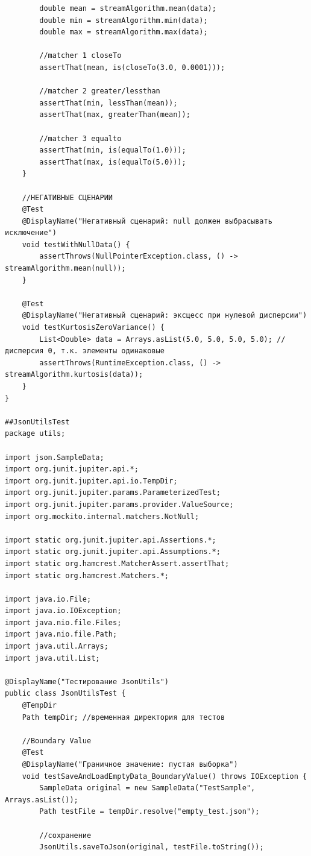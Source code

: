 \begin{verbatim}
        double mean = streamAlgorithm.mean(data);
        double min = streamAlgorithm.min(data);
        double max = streamAlgorithm.max(data);

        //matcher 1 closeTo
        assertThat(mean, is(closeTo(3.0, 0.0001)));

        //matcher 2 greater/lessthan
        assertThat(min, lessThan(mean));
        assertThat(max, greaterThan(mean));

        //matcher 3 equalto
        assertThat(min, is(equalTo(1.0)));
        assertThat(max, is(equalTo(5.0)));
    }

    //НЕГАТИВНЫЕ СЦЕНАРИИ
    @Test
    @DisplayName("Негативный сценарий: null должен выбрасывать исключение")
    void testWithNullData() {
        assertThrows(NullPointerException.class, () -> streamAlgorithm.mean(null));
    }

    @Test
    @DisplayName("Негативный сценарий: эксцесс при нулевой дисперсии")
    void testKurtosisZeroVariance() {
        List<Double> data = Arrays.asList(5.0, 5.0, 5.0, 5.0); //дисперсия 0, т.к. элементы одинаковые
        assertThrows(RuntimeException.class, () -> streamAlgorithm.kurtosis(data));
    }
}

##JsonUtilsTest
package utils;

import json.SampleData;
import org.junit.jupiter.api.*;
import org.junit.jupiter.api.io.TempDir;
import org.junit.jupiter.params.ParameterizedTest;
import org.junit.jupiter.params.provider.ValueSource;
import org.mockito.internal.matchers.NotNull;

import static org.junit.jupiter.api.Assertions.*;
import static org.junit.jupiter.api.Assumptions.*;
import static org.hamcrest.MatcherAssert.assertThat;
import static org.hamcrest.Matchers.*;

import java.io.File;
import java.io.IOException;
import java.nio.file.Files;
import java.nio.file.Path;
import java.util.Arrays;
import java.util.List;

@DisplayName("Тестирование JsonUtils")
public class JsonUtilsTest {
    @TempDir
    Path tempDir; //временная директория для тестов

    //Boundary Value
    @Test
    @DisplayName("Граничное значение: пустая выборка")
    void testSaveAndLoadEmptyData_BoundaryValue() throws IOException {
        SampleData original = new SampleData("TestSample", Arrays.asList());
        Path testFile = tempDir.resolve("empty_test.json");

        //сохранение
        JsonUtils.saveToJson(original, testFile.toString());


\end{verbatim}
